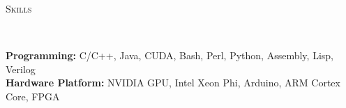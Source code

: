 \documentclass[a4paper, 12pt]{article}
\newenvironment{changemargin}[2]{%
  \begin{list}{}{%
      \setlength{\topsep}{0pt}%
      \setlength{\leftmargin}{#1}%
      \setlength{\rightmargin}{#2}%
      \setlength{\listparindent}{\parindent}%
      \setlength{\itemindent}{\parindent}%
      \setlength{\parsep}{\parskip}%
    }%
  \item[]}{\end{list}
}
\newcommand{\lineover}{
  \begin{changemargin}{-0.05in}{-0.05in}
    \vspace*{-8pt}
    \hrulefill \\
    \vspace*{-2pt}
  \end{changemargin}
}
\newcommand{\header}[1]{
  \begin{changemargin}{-0.6in}{-0.6in}
    \fontsize{15}{15}\scshape{#1}\\
    \lineover
    \vspace*{-4pt}
  \end{changemargin}
}
\newenvironment{body}
{
\vspace*{-16pt}
\begin{changemargin}{-0.25in}{-0.5in}
}
{
\end{changemargin}
}
\begin{document}

%
%
%

\smallskip
\header{Skills}
\begin{body}
  \vspace{14pt}
  \textbf{Programming:}{} C/C++, Java, CUDA, Bash, Perl, Python, Assembly, Lisp, Verilog\\
  \medskip
  \textbf{Hardware Platform:}{} NVIDIA GPU, Intel Xeon Phi, Arduino, ARM Cortex Core, FPGA\\
\end{body}
\end{document}
